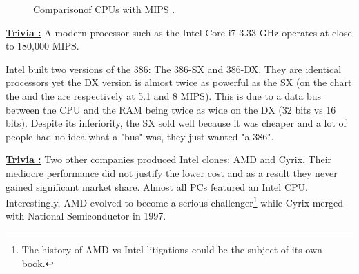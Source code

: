 \documentclass[book.tex]{subfiles}
\begin{document}
\begin{figure}[H]
\centering
   \caption{Comparison\protect\footnotemark of CPUs with MIPS \protect\footnotemark.}
 \end{figure}
 \par
 \addtocounter{footnote}{-1}
 \par
  \textbf{\underline{Trivia :}} A modern processor such as the Intel Core i7 3.33 GHz operates at close to 180,000 MIPS.\\
  \par
 Intel built two versions of the 386: The 386-SX and 386-DX. They are identical processors yet the DX version is almost twice as powerful as the SX (on the chart the  and the  are respectively at 5.1 and 8 MIPS). This is due to a data bus between the CPU and the RAM being twice as wide on the DX (32 bits vs 16 bits). Despite its inferiority, the SX sold well because it was cheaper and a lot of people had no idea what a "bus" was, they just wanted "a 386".\\



 \par
\textbf{\underline{Trivia :}} Two other companies produced Intel clones: AMD and Cyrix. Their mediocre performance did not justify the lower cost and as a result they never gained significant market share. Almost all PCs featured an Intel CPU. Interestingly, AMD evolved to become a serious challenger\footnote{The history of AMD vs Intel litigations could be the subject of its own book.} while Cyrix merged with National Semiconductor in 1997.\\
\par
\end{document}
